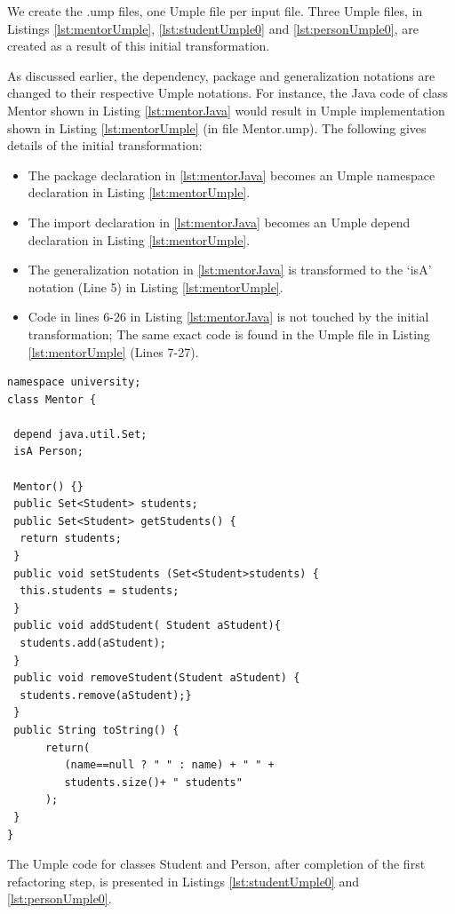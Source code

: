 We create the .ump files, one Umple file per input file. Three Umple files, in Listings \ref{lst:mentorUmple}, \ref{lst:studentUmple0} and  \ref{lst:personUmple0}, are created as a result of this initial transformation. 

As discussed earlier, the dependency, package and generalization notations are changed to their respective Umple notations. For instance, the Java code of class Mentor shown in Listing \ref{lst:mentorJava} would result in  Umple implementation shown in Listing  \ref{lst:mentorUmple} (in file Mentor.ump). The following gives details of the initial transformation:

\begin{itemize}
\item The package declaration in \ref{lst:mentorJava} becomes an Umple namespace declaration in Listing \ref{lst:mentorUmple}.
\item The import declaration in \ref{lst:mentorJava} becomes an Umple depend declaration in Listing \ref{lst:mentorUmple}.
\item The generalization notation in \ref{lst:mentorJava} is transformed to the `isA' notation (Line 5) in Listing \ref{lst:mentorUmple}.
\item Code in lines 6-26 in Listing \ref{lst:mentorJava} is not touched by the initial transformation; The same exact code is found in the Umple file in Listing \ref{lst:mentorUmple} (Lines 7-27).
\end{itemize}

\begin{lstlisting}[style=UmpleIn,caption=Mentor.ump,label=lst:mentorUmple]
namespace university;
class Mentor { 

 depend java.util.Set;
 isA Person;
 
 Mentor() {}
 public Set<Student> students;
 public Set<Student> getStudents() {
  return students; 
 } 
 public void setStudents (Set<Student>students) { 
  this.students = students;
 } 
 public void addStudent( Student aStudent){
  students.add(aStudent); 
 }
 public void removeStudent(Student aStudent) {
  students.remove(aStudent);} 
 } 
 public String toString() {
      return(
         (name==null ? " " : name) + " " +
         students.size()+ " students"
      );
 }
}
\end{lstlisting}

The Umple code for classes Student and Person, after completion of the first refactoring step, is presented in Listings \ref{lst:studentUmple0} and \ref{lst:personUmple0}. 

